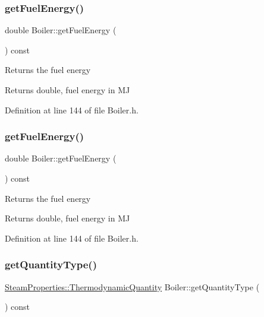\subsubsection{\texorpdfstring{get\+Fuel\+Energy()}{getFuelEnergy()}\hspace{0.1cm}{\footnotesize\ttfamily [2/3]}}
{\footnotesize\ttfamily double Boiler\+::get\+Fuel\+Energy (\begin{DoxyParamCaption}{ }\end{DoxyParamCaption}) const\hspace{0.3cm}{\ttfamily [inline]}}

Returns the fuel energy \begin{DoxyReturn}{Returns}
double, fuel energy in MJ 
\end{DoxyReturn}


Definition at line 144 of file Boiler.\+h.

\mbox{\label{class_boiler_a55542a761669c842163b20932f9747d3}} 
\subsubsection{\texorpdfstring{get\+Fuel\+Energy()}{getFuelEnergy()}\hspace{0.1cm}{\footnotesize\ttfamily [3/3]}}
{\footnotesize\ttfamily double Boiler\+::get\+Fuel\+Energy (\begin{DoxyParamCaption}{ }\end{DoxyParamCaption}) const\hspace{0.3cm}{\ttfamily [inline]}}

Returns the fuel energy \begin{DoxyReturn}{Returns}
double, fuel energy in MJ 
\end{DoxyReturn}


Definition at line 144 of file Boiler.\+h.

\mbox{\label{class_boiler_a26a71f789c9f9e05bd43a1ca0219f920}} 
\subsubsection{\texorpdfstring{get\+Quantity\+Type()}{getQuantityType()}\hspace{0.1cm}{\footnotesize\ttfamily [1/3]}}
{\footnotesize\ttfamily \hyperlink{class_steam_properties_ae0294bedf7d178c2d8fb6aed0f62fbff}{Steam\+Properties\+::\+Thermodynamic\+Quantity} Boiler\+::get\+Quantity\+Type (\begin{DoxyParamCaption}{ }\end{DoxyParamCaption}) const}

